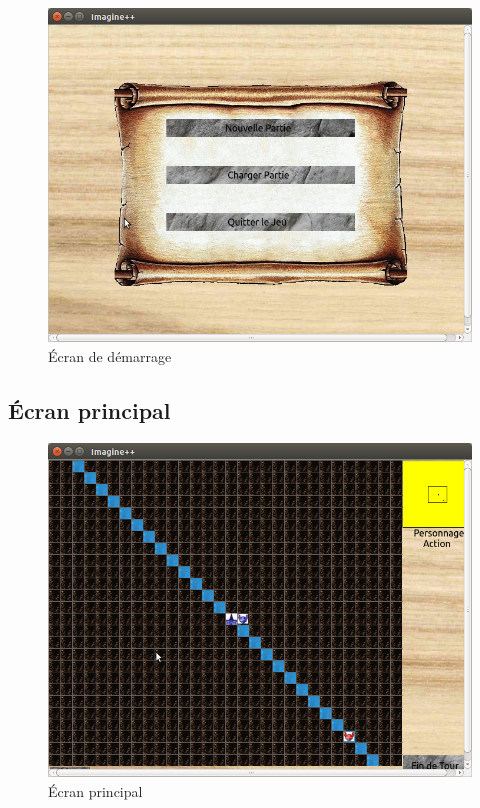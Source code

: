 \documentclass[11pt,a4paper]{article}
\begin{document}
\begin{figure}[h]
\begin{center}
\includegraphics[scale=0.5]{./graphique_demarrage.png}
\caption{Écran de démarrage}
\end{center}
\end{figure}

\clearpage


\subsection{Écran principal}

\begin{figure}[h]
\begin{center}
\includegraphics[scale=0.5]{./graphique_principal.png}
\caption{Écran principal}
\end{center}
\end{figure}
\end{document}
